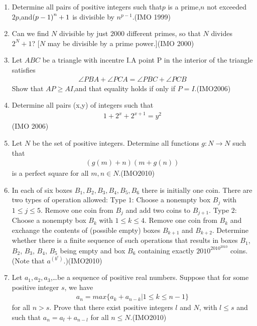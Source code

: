 \begin{enumerate}
\item Determine all pairs  of positive integers such that$p$ is a prime,$n$ not exceeded $2p$,and$\left(p-1\right)^n+1$ is divisible by $n^{p-1}$.\hfill(IMO 1999)

\item Can we find $N$ divisible by just $2000$ different primes, so that $N$ divides $2^N + 1$? [$N$ may be divisible by a prime power.]\hfill(IMO 2000)    
\item Let $ABC$ be a triangle with incentre I.A point P in the interior of the triangle satisfies
\begin{align*}
\angle{PBA} + \angle{PCA} = \angle{PBC}+ \angle{PCB} \end{align*} 
Show that $AP\geq{AI}$,and that equality holds if only if $P=I$.\hfill(IMO2006)
\item Determine all pairs (x,y) of integers such that
 \begin{align*}
 1+2^{x}+2^{x+1}=y^{2}
 \end{align*}\hfill(IMO 2006)
 \item Let $N$ be the set of positive integers. Determine all functions $g:N \rightarrow N $ such that
				\begin{align}
					(g(m)+n) (m+g(n))
				\end{align}
				is a perfect square for all $m,n \in N $.\hfill(IMO2010)
			\item In each of six boxes $B_{1}, B_{2}, B_{3}, B_{4}, B_{5}, B_{6}$ there is initially one coin. There are two types of operation allowed:
				Type $1$: Choose a nonempty box $B_{j}$ with $1\leq{j}\leq{5}$. Remove one coin from $B_{j}$ and add two coins to $B_{j+1}$.
				Type $2$: Choose a nonempty box $B_{k}$ with $1\leq{k}\leq{4}$. Remove one coin from $B_{k}$ and exchange the contents of (possible empty) boxes $B_{k+1}$ and $B_{k+2}$.
				Determine whether there is a finite sequence of such operations that results in boxes $B_{1}$, $B_{2}$, $B_{3}$, $B_{4}$, $B_{5}$ being empty and box $B_{6}$ containing exactly $2010^{2010^{2010}}$ coins. (Note that $a^{(b^{c})}$.)\hfill(IMO2010)
			\item Let $a_{1}, a_{2}, a_{3}$,\dots be a sequence of positive real numbers. Suppose that for some positive integer $s$, we have
				\begin{align}
					a_{n}=max\{a_{k}+a_{n-k}\vert1\leq{k}\leq{n-1}\}
				\end{align}
				for all $n>s$. Prove that there exist positive integers $l$ and $N$, with $l\leq{s}$ and such that $a_{n}=a_{l}+a_{n-l}$ for all $n\leq{N}$.\hfill(IMO2010)

\end{enumerate}
